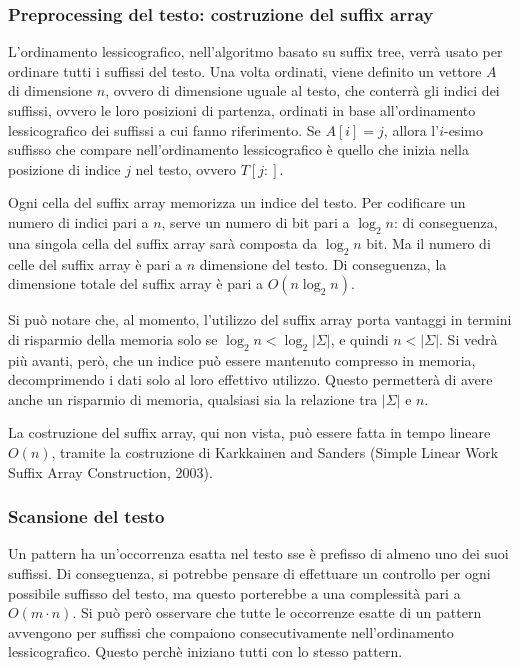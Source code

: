 \subsubsection{Preprocessing del testo: costruzione del suffix array}
L'ordinamento lessicografico, nell'algoritmo basato su suffix tree, verrà usato per ordinare tutti i suffissi del testo.
Una volta ordinati, viene definito un vettore $A$ di dimensione $n$, ovvero di dimensione uguale al testo, che conterrà gli indici dei suffissi, ovvero le loro posizioni di partenza, ordinati in base all'ordinamento lessicografico dei suffissi a cui fanno riferimento.
Se $A[i] = j$, allora l'$i$-esimo suffisso che compare nell'ordinamento lessicografico è quello che inizia nella posizione di indice $j$ nel testo, ovvero $T[j:]$.

Ogni cella del suffix array memorizza un indice del testo. Per codificare un numero di indici pari a $n$, serve un numero di bit pari a $\log_2 n$: di conseguenza, una singola cella del suffix array sarà composta da $\log_2 n$ bit.
Ma il numero di celle del suffix array è pari a $n$ dimensione del testo.
Di conseguenza, la dimensione totale del suffix array è pari a $O(n \log_2 n)$.

Si può notare che, al momento, l'utilizzo del suffix array porta vantaggi in termini di risparmio della memoria solo se $\log_2 n < \log_2 |\Sigma|$, e quindi $n < |\Sigma|$.
Si vedrà più avanti, però, che un indice può essere mantenuto compresso in memoria, decomprimendo i dati solo al loro effettivo utilizzo. Questo permetterà di avere anche un risparmio di memoria, qualsiasi sia la relazione tra $|\Sigma|$ e $n$.

La costruzione del suffix array, qui non vista, può essere fatta in tempo lineare $O(n)$, tramite la costruzione di Karkkainen and Sanders (Simple Linear Work Suffix Array Construction, 2003).

\subsubsection{Scansione del testo}
Un pattern ha un'occorrenza esatta nel testo sse è prefisso di almeno uno dei suoi suffissi.
Di conseguenza, si potrebbe pensare di effettuare un controllo per ogni possibile suffisso del testo, ma questo porterebbe a una complessità pari a $O(m \cdot n)$.
Si può però osservare che tutte le occorrenze esatte di un pattern avvengono per suffissi che compaiono consecutivamente nell'ordinamento lessicografico.
Questo perchè iniziano tutti con lo stesso pattern.

